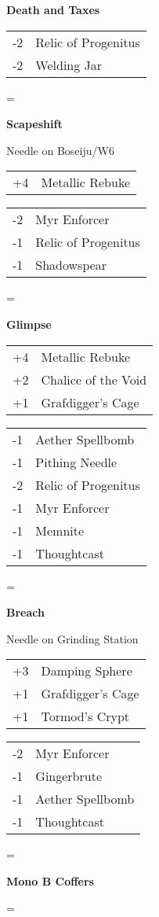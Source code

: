 \documentclass[fontsize=12pt,paper=a4]{scrartcl}
\newenvironment{absolutelynopagebreak}
  {\par\nobreak\vfil\penalty0\vfilneg
   \vtop\bgroup}
  {\par\xdef\tpd{\the\prevdepth}\egroup
   \prevdepth=\tpd}
\newenvironment{decklist}{%
    \begin{tabular}{>{\hspace{-4pt}}r<{\hspace{-3pt}}>{\hspace{-3pt}}l<{\hspace{-4pt}}}
    }{%
    \end{tabular}
    \par
}
\newcommand{\card}[2]{#1 & #2\\}
\newenvironment{sideboardguide}{%
    \newpage
    \begin{multicols}{4}
        \begin{tiny}
        }{%
        \end{tiny}
    \end{multicols}
}
\newenvironment{matchup}[1]{%
    \begin{absolutelynopagebreak}
        \textbf{#1}\par
    }{%
    \end{absolutelynopagebreak}
    \par\vspace{2em}
}
\newenvironment{notes}{%
}{%
    \par
}
\begin{document}
\begin{sideboardguide}
\begin{matchup}{Death and Taxes}
        \begin{decklist}
            \card{-2}{Relic of Progenitus}
            \card{-2}{Welding Jar}
        \end{decklist}
    \end{matchup}
    \begin{matchup}{Scapeshift}
        \begin{notes}
            Needle on Boseiju/W6
        \end{notes}
        \begin{decklist}
            \card{+4}{Metallic Rebuke}
        \end{decklist}
        \begin{decklist}
            \card{-2}{Myr Enforcer}
            \card{-1}{Relic of Progenitus}
            \card{-1}{Shadowspear}
        \end{decklist}
    \end{matchup}
    \begin{matchup}{Glimpse}
        \begin{decklist}
            \card{+4}{Metallic Rebuke}
            \card{+2}{Chalice of the Void}
            \card{+1}{Grafdigger's Cage}
        \end{decklist}
        \begin{decklist}
            \card{-1}{Aether Spellbomb}
            \card{-1}{Pithing Needle}
            \card{-2}{Relic of Progenitus}
            \card{-1}{Myr Enforcer}
            \card{-1}{Memnite}
            \card{-1}{Thoughtcast}
        \end{decklist}
    \end{matchup}
    \begin{matchup}{Breach}
        \begin{notes}
            Needle on Grinding Station
        \end{notes}
        \begin{decklist}
            \card{+3}{Damping Sphere}
            \card{+1}{Grafdigger's Cage}
            \card{+1}{Tormod's Crypt}
        \end{decklist}
        \begin{decklist}
            \card{-2}{Myr Enforcer}
            \card{-1}{Gingerbrute}
            \card{-1}{Aether Spellbomb}
            \card{-1}{Thoughtcast}
        \end{decklist}
    \end{matchup}
    \begin{matchup}{Mono B Coffers}
        \begin{notes}

\end{notes}
\end{matchup}
\end{sideboardguide}
\end{document}
